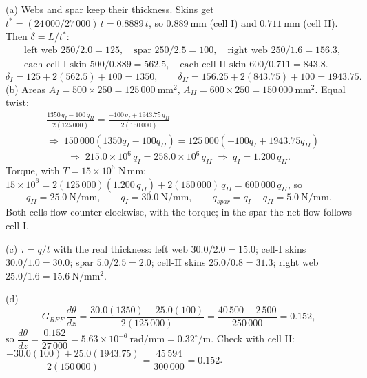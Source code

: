 \documentclass[11pt]{article}
\newcommand{\mm}{\ \mathrm{mm}}
\newcommand{\Nmm}{\ \mathrm{N/mm}}
\begin{document}
(a) Webs and spar keep their thickness. Skins get $t^* = (24\,000/27\,000)\,t = 0.8889\,t$, so $0.889\mm$ (cell I)
and $0.711\mm$ (cell II). Then $\delta = L/t^*$:
\begin{align*}
&\text{left web } 250/2.0 = 125, \quad \text{spar } 250/2.5 = 100, \quad \text{right web } 250/1.6 = 156.3,\\
&\text{each cell-I skin } 500/0.889 = 562.5, \quad \text{each cell-II skin } 600/0.711 = 843.8 .
\end{align*}
\[ \delta_I = 125 + 2(562.5) + 100 = 1350, \qquad \delta_{II} = 156.25 + 2(843.75) + 100 = 1943.75 . \]
(b) Areas $A_I = 500\times250 = 125\,000\mm^2$, $A_{II} = 600\times250 = 150\,000\mm^2$. Equal twist:
\begin{align*}
&\frac{1350\,q_I - 100\,q_{II}}{2(125\,000)} = \frac{-100\,q_I + 1943.75\,q_{II}}{2(150\,000)}\\
&\Rightarrow\; 150\,000(1350q_I - 100q_{II}) = 125\,000(-100q_I + 1943.75q_{II})
\end{align*}
\[ \Rightarrow\; 215.0\times10^6\,q_I = 258.0\times10^6\,q_{II} \;\Rightarrow\; q_I = 1.200\,q_{II} . \]
Torque, with $T = 15\times10^6$ N\,mm:
$15\times10^6 = 2(125\,000)(1.200\,q_{II}) + 2(150\,000)\,q_{II} = 600\,000\,q_{II}$, so
\[ q_{II} = 25.0\Nmm, \qquad q_I = 30.0\Nmm, \qquad q_{spar} = q_I - q_{II} = 5.0\Nmm . \]
Both cells flow counter-clockwise, with the torque; in the spar the net flow follows cell I.

(c) $\tau = q/t$ with the real thickness: left web $30.0/2.0 = 15.0$; cell-I skins $30.0/1.0 = 30.0$; spar
$5.0/2.5 = 2.0$; cell-II skins $25.0/0.8 = 31.3$; right web $25.0/1.6 = 15.6\ \mathrm{N/mm^2}$.

(d) \[ G_{REF}\,\frac{d\theta}{dz} = \frac{30.0(1350) - 25.0(100)}{2(125\,000)} = \frac{40\,500 - 2\,500}{250\,000} = 0.152, \]
so $\dfrac{d\theta}{dz} = \dfrac{0.152}{27\,000} = 5.63\times10^{-6}\ \mathrm{rad/mm} = 0.32^\circ/\mathrm{m}$. Check with cell II:
$\dfrac{-30.0(100) + 25.0(1943.75)}{2(150\,000)} = \dfrac{45\,594}{300\,000} = 0.152$. \checkmark
\end{document}
